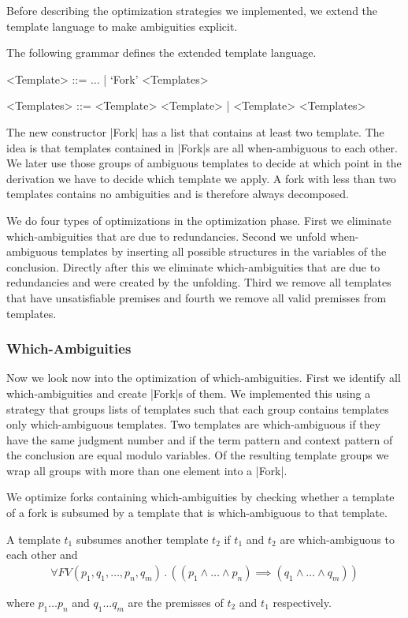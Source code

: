 Before describing the optimization strategies we implemented, we
extend the template language to make ambiguities explicit.

\begin{definition}
    The following grammar defines the extended template language.
    \begin{grammar}
    <Template> ::= $\dots$ | `Fork' <Templates>

    <Templates> ::= <Template> <Template> | <Template> <Templates>
    \end{grammar}
\end{definition}

The new constructor \code|Fork| has a list that contains at least two
template. The idea is that templates contained in \code|Fork|s are all
when-ambiguous to each other. We later use those groups of ambiguous
templates to decide at which point in the derivation we have to decide
which template we apply. A fork with less than two templates contains
no ambiguities and is therefore always decomposed.

We do four types of optimizations in the optimization phase. First we
eliminate which-ambiguities that are due to redundancies. Second we
unfold when-ambiguous templates by inserting all possible structures
in the variables of the conclusion. Directly after this we eliminate
which-ambiguities that are due to redundancies and were created by the
unfolding. Third we remove all templates that have unsatisfiable
premises and fourth we remove all valid premisses from templates.

\subsubsection{Which-Ambiguities}
Now we look now into the optimization of which-ambiguities. First we
identify all which-ambiguities and create \code|Fork|s of them. We
implemented this using a strategy that groups lists of templates such
that each group contains templates only which-ambiguous templates. Two
templates are which-ambiguous if they have the same judgment number
and if the term pattern and context pattern of the conclusion are
equal modulo variables. Of the resulting template groups we wrap all
groups with more than one element into a \code|Fork|.

We optimize forks containing which-ambiguities by checking whether a
template of a fork is subsumed by a template that is which-ambiguous
to that template.

\begin{definition}
  A template $t_1$ subsumes another template $t_2$ if $t_1$ and $t_2$
  are which-ambiguous to each other and
  \begin{align}
    \forall FV(p_1,q_1,\dots, p_n,q_m) \,.\, ((p_1 \land\dots\land
    p_n) \implies (q_1 \land\dots\land q_m))
  \end{align}

  where $p_1 \dots p_n$ and $q_1 \dots q_m$ are the premisses of $t_2$
  and $t_1$ respectively.
\label{def:subsumes}
\end{definition}

